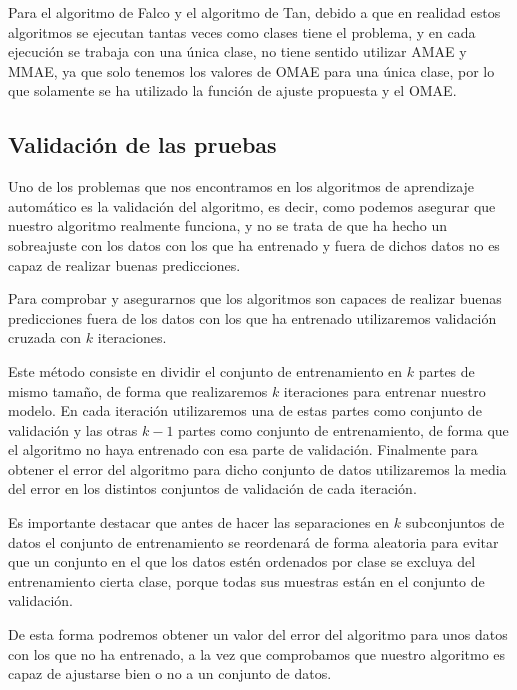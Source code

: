 Para el algoritmo de Falco y el algoritmo de Tan, debido a que en realidad estos algoritmos se ejecutan tantas veces como clases tiene el problema, y en cada ejecución se trabaja con una única clase, no tiene sentido utilizar AMAE y MMAE, ya que solo tenemos los valores de OMAE para una única clase, por lo que solamente se ha utilizado la función de ajuste propuesta y el OMAE.


\subsection{Validación de las pruebas}


Uno de los problemas que nos encontramos en los algoritmos de aprendizaje automático es la validación del algoritmo, es decir, como podemos asegurar que nuestro algoritmo realmente funciona, y no se trata de que ha hecho un sobreajuste con los datos con los que ha entrenado y fuera de dichos datos no es capaz de realizar buenas predicciones.

Para comprobar y asegurarnos que los algoritmos son capaces de realizar buenas predicciones fuera de los datos con los que ha entrenado utilizaremos validación cruzada con $k$ iteraciones.

Este método consiste en dividir el conjunto de entrenamiento en $k$ partes de mismo tamaño, de forma que realizaremos $k$ iteraciones para entrenar nuestro modelo. En cada iteración utilizaremos una de estas partes como conjunto de validación y las otras $k - 1$ partes como conjunto de entrenamiento, de forma que el algoritmo no haya entrenado con esa parte de validación. Finalmente para obtener el error del algoritmo para dicho conjunto de datos utilizaremos la media del error en los distintos conjuntos de validación de cada iteración.

Es importante destacar que antes de hacer las separaciones en $k$ subconjuntos de datos el conjunto de entrenamiento se reordenará de forma aleatoria para evitar que un conjunto en el que los datos estén ordenados por clase se excluya del entrenamiento cierta clase, porque todas sus muestras están en el conjunto de validación.

De esta forma podremos obtener un valor del error del algoritmo para unos datos con los que no ha entrenado, a la vez que comprobamos que nuestro algoritmo es capaz de ajustarse bien o no a un conjunto de datos.


